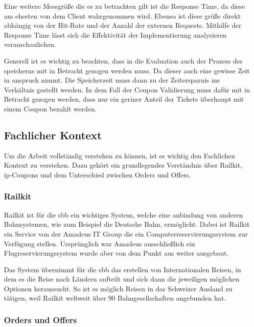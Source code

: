Eine weitere Messgröße die es zu betrachten gilt ist die Response Time, da diese am ehesten von dem Client wahrgenommen wird. Ebenso ist diese größe direkt abhängig von der Hit-Rate und der Anzahl der externen Requests. Mithilfe der Response Time lässt sich die Effektivität der Implementierung analysieren veranschaulichen. 

Generell ist es wichtig zu beachten, dass in die Evaluation auch der Prozess des speicherns mit in Betracht gezogen werden muss. Da dieser auch eine gewisse Zeit in anspruch nimmt. Die Speicherzeit muss dann zu der Zeitersparnis ins Verhältnis gestellt werden. In dem Fall der Coupon Validierung muss dafür mit in Betracht gezogen werden, dass nur ein geriner Anteil der Tickets überhaupt mit einem Coupon bezahlt werden.



\subsection{Fachlicher Kontext}

Um die Arbeit vollständig verstehen zu können, ist es wichtig den Fachlichen Kontext zu verstehen. Dazu gehört ein grundlegendes Verständnis über Railkit, \ac{ip}-Coupons und dem Unterschied zwischen Orders und Offers.

\subsubsection{Railkit}

Railkit ist für die \ac{sbb} ein wichtiges System, welche eine anbindung von anderen Bahnsystemen, wie zum Beispiel die Deutsche Bahn, ermöglicht. Dabei ist Railkit ein Service von der Amadeus IT Group die ein Computerreservierungssystem zur Verfügung stellen. Ursprünglich war Amadeus ausschließlich ein Flugreservierungssystem wurde aber von dem Punkt aus weiter ausgebaut. %

Das System übernimmt für die \ac{sbb} das erstellen von Internationalen Reisen, in dem es die Reise nach Ländern aufteilt und sich dann die jeweiligen möglichen Optionen heraussucht. So ist es möglich Reisen in das Schweizer Ausland zu tätigen, weil Railkit weltweit über 90 Bahngesellschaften angebunden hat. %

\subsubsection{Orders und Offers}

